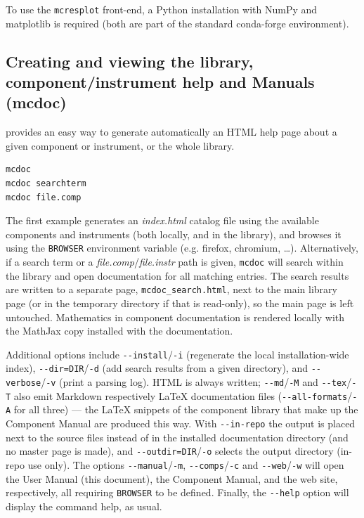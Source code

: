 To use the \verb+mcresplot+ front-end, a Python installation with NumPy and
matplotlib is required (both are part of the standard \MCS conda-forge
environment).

\subsection{Creating and viewing the library, component/instrument help and
  Manuals (mcdoc)}
\label{s:mcdoc-run}

\MCS provides an easy way to generate automatically an HTML help page about a
given component or instrument, or the whole \MCS
library. 
\begin{lstlisting}
mcdoc
mcdoc searchterm
mcdoc file.comp
\end{lstlisting}
The first example generates an \textit{index.html} catalog file using the available
components and instruments (both locally, and in the \MCS library), and browses
it using the \verb+BROWSER+ environment variable
(e.g. firefox, chromium, \ldots). Alternatively, if a search term or a
\textit{file.comp}/\textit{file.instr} path is given, \verb+mcdoc+ will
search within the library and open documentation for all matching entries. The search results are written to a
separate page, \texttt{mcdoc\_search.html}, next to the main library page (or in the temporary directory if that is read-only), so the main page is left untouched. Mathematics in component documentation is rendered locally with the MathJax copy installed with the documentation.

Additional options include \verb+--install+/\verb+-i+ (regenerate the local
installation-wide index), \verb+--dir=DIR+/\verb+-d+ (add search results from
a given directory), and \verb+--verbose+/\verb+-v+ (print a parsing log).
HTML is always written; \verb+--md+/\verb+-M+ and \verb+--tex+/\verb+-T+ also
emit Markdown respectively \LaTeX{} documentation files (\verb+--all-formats+/\verb+-A+
for all three) --- the \LaTeX{} snippets of the component library that make up
the Component Manual are produced this way. With \verb+--in-repo+ the output is
placed next to the source files instead of in the installed documentation
directory (and no master page is made), and \verb+--outdir=DIR+/\verb+-o+
selects the output directory (in-repo use only).
The options \verb+--manual+/\verb+-m+, \verb+--comps+/\verb+-c+ and
\verb+--web+/\verb+-w+ will open the User Manual (this document), the
Component Manual, and the \MCS web site, respectively, all requiring
\verb+BROWSER+ to be defined. Finally, the \verb+--help+
option will display the command help, as usual.

